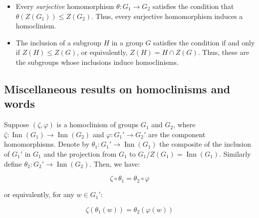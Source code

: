 \documentclass{ucetd}
\begin{document}
\begin{itemize}
\item Every {\em surjective} homomorphism $\theta:G_1 \to G_2$
  satisfies the condition that $\theta(Z(G_1)) \le Z(G_2)$. Thus,
  every surjective homomorphism induces a homoclinism.
\item The inclusion of a subgroup $H$ in a group $G$ satisfies the
  condition if and only if $Z(H) \le Z(G)$, or equivalently, $Z(H) = H
  \cap Z(G)$. Thus, these are the subgroups whose inclusions induce
  homoclinisms.
\end{itemize}

\subsection{Miscellaneous results on homoclinisms and words}\label{sec:homoclinism-misc-results}

\begin{lemma}
  Suppose $(\zeta,\varphi)$ is a homoclinism of groups $G_1$ and
  $G_2$, where $\zeta:\operatorname{Inn}(G_1) \to
  \operatorname{Inn}(G_2)$ and $\varphi:G_1' \to G_2'$ are the
  component homomorphisms. Denote by $\theta_1:G_1' \to
  \operatorname{Inn}(G_1)$ the composite of the inclusion of $G_1'$ in
  $G_1$ and the projection from $G_1$ to $G_1/Z(G_1) =
  \operatorname{Inn}(G_1)$. Similarly define $\theta_2:G_2' \to
  \operatorname{Inn}(G_2)$. Then, we have:
  
  $$\zeta \circ \theta_1 = \theta_2 \circ \varphi$$

  or equivalently, for any $w \in G_1'$:

  $$\zeta(\theta_1(w)) = \theta_2(\varphi(w))$$
\end{lemma}
\end{document}
